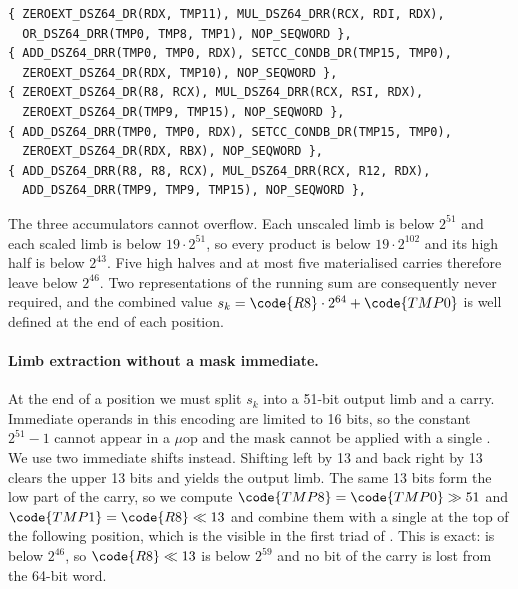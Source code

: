 \begin{lstlisting}[caption={The opening five triads of an output position, taken
from position one. Slot~2 of the first triad forms the incoming carry, slot~0 of
each even triad stages the next second-operand limb into \code{RDX}, and each
addition into \code{TMP0} is immediately followed by the \code{SETCC} that
materialises its carry. The high accumulator and the carry accumulator are
initialised in the third triad, after which both chains advance in parallel with
the multiplies.},label={lst:c25519-mulblock}]
{ ZEROEXT_DSZ64_DR(RDX, TMP11), MUL_DSZ64_DRR(RCX, RDI, RDX),
  OR_DSZ64_DRR(TMP0, TMP8, TMP1), NOP_SEQWORD },
{ ADD_DSZ64_DRR(TMP0, TMP0, RDX), SETCC_CONDB_DR(TMP15, TMP0),
  ZEROEXT_DSZ64_DR(RDX, TMP10), NOP_SEQWORD },
{ ZEROEXT_DSZ64_DR(R8, RCX), MUL_DSZ64_DRR(RCX, RSI, RDX),
  ZEROEXT_DSZ64_DR(TMP9, TMP15), NOP_SEQWORD },
{ ADD_DSZ64_DRR(TMP0, TMP0, RDX), SETCC_CONDB_DR(TMP15, TMP0),
  ZEROEXT_DSZ64_DR(RDX, RBX), NOP_SEQWORD },
{ ADD_DSZ64_DRR(R8, R8, RCX), MUL_DSZ64_DRR(RCX, R12, RDX),
  ADD_DSZ64_DRR(TMP9, TMP9, TMP15), NOP_SEQWORD },
\end{lstlisting}

The three accumulators cannot overflow.
Each unscaled limb is below $2^{51}$ and each scaled limb is below $19\cdot2^{51}$,
so every product is below $19\cdot2^{102}$ and its high half is below $2^{43}$.
Five high halves and at most five materialised carries therefore leave 
below $2^{46}$.
Two representations of the running sum are consequently never required, and the
combined value $s_k=\code{R8}\cdot2^{64}+\code{TMP0}$ is well defined at the end of
each position.

\paragraph{Limb extraction without a mask immediate.}
At the end of a position we must split $s_k$ into a 51-bit output limb and a carry.
Immediate operands in this encoding are limited to 16 bits, so the constant
$2^{51}-1$ cannot appear in a $\mu$op and the mask cannot be applied with a single
.
We use two immediate shifts instead.
Shifting  left by 13 and back right by 13 clears the upper 13 bits and
yields the output limb.
The same 13 bits form the low part of the carry, so we compute
$\code{TMP8}=\code{TMP0}\gg51$ and $\code{TMP1}=\code{R8}\ll13$ and combine them
with a single  at the top of the following position, which is the
 visible in the first triad of .
This is exact:  is below $2^{46}$, so $\code{R8}\ll13$ is below $2^{59}$
and no bit of the carry is lost from the 64-bit word.

